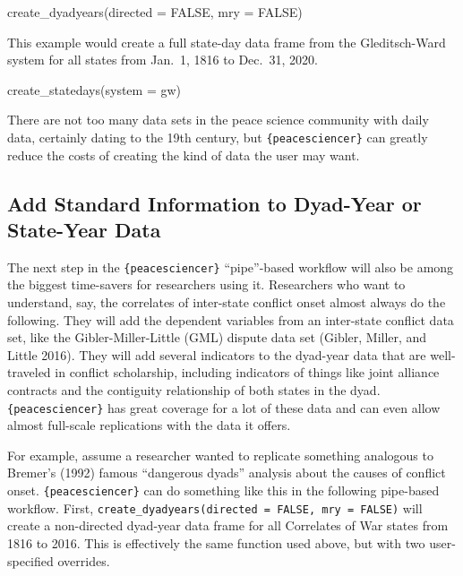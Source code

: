 \documentclass[
  11pt,
]{article}
\newenvironment{Shaded}{\begin{snugshade}}{\end{snugshade}}
\newcommand{\AttributeTok}[1]{\textcolor[rgb]{0.77,0.63,0.00}{#1}}
\newcommand{\ConstantTok}[1]{\textcolor[rgb]{0.00,0.00,0.00}{#1}}
\newcommand{\FunctionTok}[1]{\textcolor[rgb]{0.00,0.00,0.00}{#1}}
\newcommand{\NormalTok}[1]{#1}
\newcommand{\StringTok}[1]{\textcolor[rgb]{0.31,0.60,0.02}{#1}}
\begin{document}
\begin{Shaded}
\begin{Highlighting}[]
\FunctionTok{create\_dyadyears}\NormalTok{(}\AttributeTok{directed =} \ConstantTok{FALSE}\NormalTok{, }\AttributeTok{mry =} \ConstantTok{FALSE}\NormalTok{)}
\end{Highlighting}
\end{Shaded}

This example would create a full state-day data frame from the Gleditsch-Ward system for all states from Jan.~1, 1816 to Dec.~31, 2020.

\begin{Shaded}
\begin{Highlighting}[]
\FunctionTok{create\_statedays}\NormalTok{(}\AttributeTok{system =} \StringTok{\textquotesingle{}gw\textquotesingle{}}\NormalTok{)}
\end{Highlighting}
\end{Shaded}

There are not too many data sets in the peace science community with daily data, certainly dating to the 19th century, but \texttt{\{peacesciencer\}} can greatly reduce the costs of creating the kind of data the user may want.

\hypertarget{add-standard-information-to-dyad-year-or-state-year-data}{%
\subsection{Add Standard Information to Dyad-Year or State-Year Data}\label{add-standard-information-to-dyad-year-or-state-year-data}}

The next step in the \texttt{\{peacesciencer\}} ``pipe''-based workflow will also be among the biggest time-savers for researchers using it. Researchers who want to understand, say, the correlates of inter-state conflict onset almost always do the following. They will add the dependent variables from an inter-state conflict data set, like the Gibler-Miller-Little (GML) dispute data set (Gibler, Miller, and Little 2016). They will add several indicators to the dyad-year data that are well-traveled in conflict scholarship, including indicators of things like joint alliance contracts and the contiguity relationship of both states in the dyad. \texttt{\{peacesciencer\}} has great coverage for a lot of these data and can even allow almost full-scale replications with the data it offers.

For example, assume a researcher wanted to replicate something analogous to Bremer's (1992) famous ``dangerous dyads'' analysis about the causes of conflict onset. \texttt{\{peacesciencer\}} can do something like this in the following pipe-based workflow. First, \texttt{create\_dyadyears(directed\ =\ FALSE,\ mry\ =\ FALSE)} will create a non-directed dyad-year data frame for all Correlates of War states from 1816 to 2016. This is effectively the same function used above, but with two user-specified overrides.
\end{document}
